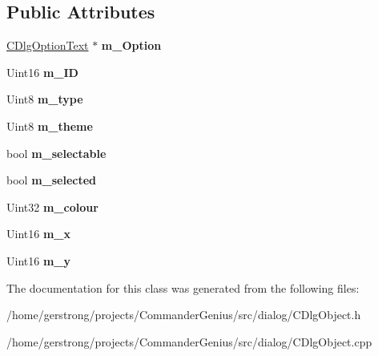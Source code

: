 \subsection*{Public Attributes}
\begin{DoxyCompactItemize}
\item 
\hypertarget{class_c_dlg_object_a70533971baf04f0054e5041fd69e0003}{
\hyperlink{class_c_dlg_option_text}{CDlgOptionText} $\ast$ {\bfseries m\_\-Option}}
\label{class_c_dlg_object_a70533971baf04f0054e5041fd69e0003}

\item 
\hypertarget{class_c_dlg_object_a287b00a911dd73ccd0d77238123cc71c}{
Uint16 {\bfseries m\_\-ID}}
\label{class_c_dlg_object_a287b00a911dd73ccd0d77238123cc71c}

\item 
\hypertarget{class_c_dlg_object_ad41aa13a27b74847fdf8b0fa1058656a}{
Uint8 {\bfseries m\_\-type}}
\label{class_c_dlg_object_ad41aa13a27b74847fdf8b0fa1058656a}

\item 
\hypertarget{class_c_dlg_object_a301a7853cd170c5d66bf5fa1fe2fde73}{
Uint8 {\bfseries m\_\-theme}}
\label{class_c_dlg_object_a301a7853cd170c5d66bf5fa1fe2fde73}

\item 
\hypertarget{class_c_dlg_object_a9d25cd7538098c4040e259d75867482f}{
bool {\bfseries m\_\-selectable}}
\label{class_c_dlg_object_a9d25cd7538098c4040e259d75867482f}

\item 
\hypertarget{class_c_dlg_object_a27079ba5c993fd5bafef5e4fff67aff7}{
bool {\bfseries m\_\-selected}}
\label{class_c_dlg_object_a27079ba5c993fd5bafef5e4fff67aff7}

\item 
\hypertarget{class_c_dlg_object_ae89f3ab2245c74877d193bad47cfbacc}{
Uint32 {\bfseries m\_\-colour}}
\label{class_c_dlg_object_ae89f3ab2245c74877d193bad47cfbacc}

\item 
\hypertarget{class_c_dlg_object_af200fc39001c4b00ac5232f154044663}{
Uint16 {\bfseries m\_\-x}}
\label{class_c_dlg_object_af200fc39001c4b00ac5232f154044663}

\item 
\hypertarget{class_c_dlg_object_ae2b6b8a7ac13464e85816f5e9a74746e}{
Uint16 {\bfseries m\_\-y}}
\label{class_c_dlg_object_ae2b6b8a7ac13464e85816f5e9a74746e}

\end{DoxyCompactItemize}


The documentation for this class was generated from the following files:\begin{DoxyCompactItemize}
\item 
/home/gerstrong/projects/CommanderGenius/src/dialog/CDlgObject.h\item 
/home/gerstrong/projects/CommanderGenius/src/dialog/CDlgObject.cpp\end{DoxyCompactItemize}

